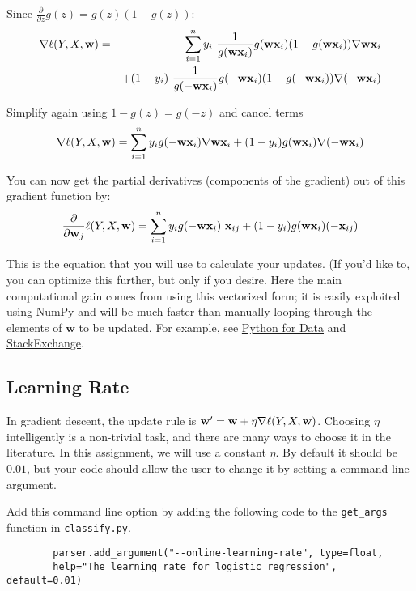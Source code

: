 \documentclass[11pt]{article}
\newcommand{\vw}{{\bf w}}
\newcommand{\vxi}{{\bf x}_i}
\newcommand{\vxij}{{\bf x}_{ij}}
\newcommand{\code}[1]{{\footnotesize \tt #1}}
\begin{document}
Since $\frac{\partial}{\partial z}g(z) = g(z)(1-g(z))$:
\begin{eqnarray}
\nabla \ell(Y,X,\vw) &=& \sum_{i=1}^n 
	 y_i\ \frac{1}{g(\vw \vxi)} g(\vw \vxi) (1-g(\vw \vxi)) \nabla \vw \vxi \\
& & 	+ (1-y_i)\ \frac{1}{g(-\vw \vxi)} g(-\vw \vxi) (1-g(-\vw \vxi)) \nabla (-\vw \vxi)
\end{eqnarray}

Simplify again using $1-g(z) = g(-z)$ and cancel terms
\begin{equation}
\nabla \ell(Y,X,\vw) = \sum_{i=1}^n{
	y_i g(-\vw \vxi) \nabla \vw \vxi
	+ (1-y_i) g(\vw \vxi) \nabla (-\vw \vxi)
}
\end{equation}

You can now get the partial derivatives (components of the gradient) out of this gradient function by:
\begin{equation}
\frac{\partial}{\partial \vw_j} \ell(Y,X,\vw) = \sum_{i=1}^n{
	y_i g(-\vw \vxi) \ \vxij
	+ (1-y_i) g(\vw \vxi) (-\vxij)
}
\end{equation}

This is the equation that you will use to calculate your updates. (If you'd like to, you can optimize this further, but only if you desire. Here the main computational gain comes from using this vectorized form; it is easily exploited using NumPy and will be much faster than manually looping through the elements of $\mathbf{w}$ to be updated. For example, see \href{https://www.safaribooksonline.com/library/view/python-for-data/9781449323592/ch04.html}{Python for Data} and \href{https://softwareengineering.stackexchange.com/questions/254475/how-do-i-move-away-from-the-for-loop-school-of-thought}{StackExchange}.

\subsection{Learning Rate}
In gradient descent, the update rule is $\vw' = \vw + \eta \nabla \ell(Y,X,\vw)$. Choosing $\eta$ intelligently is a non-trivial task, and there are many ways to choose it in the literature. In this assignment, we will use a constant $\eta$. By default it should be $0.01$, but your code should allow the user to change it by setting a command line argument.

Add this command line option by adding the following code to the \code{get\_args} function in \code{classify.py}.
	\begin{footnotesize}
		\begin{verbatim}
		parser.add_argument("--online-learning-rate", type=float, 
		help="The learning rate for logistic regression", default=0.01)
		\end{verbatim}
	\end{footnotesize}
\end{document}
